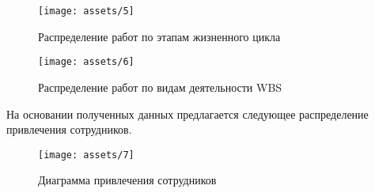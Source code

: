 \begin{figure}[H]
    \begin{center}
    \texttt{[image: assets/5]}
    \caption{Распределение работ по этапам жизненного цикла}
    \label{fig:5}
    \end{center}
\end{figure}

\begin{figure}[H]
    \begin{center}
    \texttt{[image: assets/6]}
    \caption{Распределение работ по видам деятельности WBS}
    \label{fig:6}
    \end{center}
\end{figure}

На основании полученных данных предлагается следующее распределение привлечения сотрудников.

\begin{figure}[H]
    \begin{center}
    \texttt{[image: assets/7]}
    \caption{Диаграмма привлечения сотрудников}
    \label{fig:7}
    \end{center}
\end{figure}
